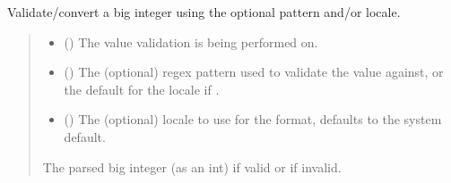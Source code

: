 \documentclass[letterpaper,10pt,english]{sphinxmanual}
\begin{document}
\begin{fulllineitems}
\begin{fulllineitems}
\label{\detokenize{apache_commons_validator_python.routines:apache_commons_validator_python.routines.big_integer_validator.BigIntegerValidator.validate}}
\pysigstartsignatures
{}
\pysigstopsignatures
\sphinxAtStartPar
Validate/convert a big integer using the optional pattern and/or locale.
\begin{quote}\begin{description}
\begin{itemize}
\item {} 
\sphinxAtStartPar
{} () \textendash{} The value validation is being performed on.

\item {} 
\sphinxAtStartPar
{} () \textendash{} The (optional) regex pattern used to validate the value against,
or the default for the locale if .

\item {} 
\sphinxAtStartPar
{} () \textendash{} The (optional) locale to use for the format, defaults to the system default.

\end{itemize}

\sphinxAtStartPar
The parsed big integer (as an int) if valid or  if invalid.

\end{description}\end{quote}

\end{fulllineitems}


\end{fulllineitems}
\end{document}
